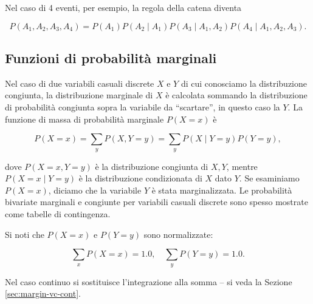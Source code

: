 \documentclass[
  11pt,
]{krantz}
\theoremstyle{definition}
\theoremstyle{definition}
\theoremstyle{definition}
\theoremstyle{definition}
\theoremstyle{remark}
\begin{document}
Nel caso di 4 eventi, per esempio, la regola della catena diventa

\[
P(A_1, A_2, A_3, A_4) = P(A_1) P(A_2 \mid A_1) P(A_3 \mid A_1, A_2) P(A_4 \mid A_1, A_2, A_3).
\]

\hypertarget{sec:marg-distr-discr}{%
\subsection{Funzioni di probabilità marginali}\label{sec:marg-distr-discr}}

Nel caso di due variabili casuali discrete \(X\) e \(Y\) di cui conosciamo la distribuzione congiunta, la distribuzione marginale di \(X\) è calcolata sommando la distribuzione di probabilità congiunta sopra la variabile da ``scartare'', in questo caso la \(Y\). La funzione di massa di probabilità marginale \(P(X=x)\) è

\begin{equation}
P(X = x) = \sum_y P(X, Y = y) = \sum_y P(X \mid Y = y) P(Y = y),
\end{equation}

dove \(P(X = x,Y = y)\) è la distribuzione congiunta di \(X, Y\), mentre \(P(X = x \mid Y = y)\) è la distribuzione condizionata di \(X\) dato \(Y\). Se esaminiamo \(P(X=x)\), diciamo che la variabile \(Y\) è stata marginalizzata. Le probabilità bivariate marginali e congiunte per variabili casuali discrete sono spesso mostrate come tabelle di contingenza.

Si noti che \(P(X = x)\) e \(P(Y = y)\) sono normalizzate:

\[
\sum_x P(X=x) = 1.0, \quad \sum_y P(Y=y) = 1.0.
\]

Nel caso continuo si sostituisce l'integrazione alla somma -- si veda la Sezione \ref{sec:margin-vc-cont}.
\end{document}
